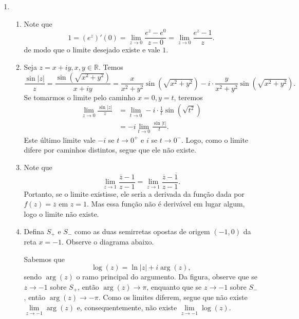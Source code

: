 \documentclass[12pt,a4paper]{article}
\begin{document}
\begin{enumerate}
		\item 
		\begin{enumerate}
			\item Note que 
			$$
			1 = (e^z)'(0) = \lim\limits_{z\to 0} \frac{e^z - e^0}{z - 0} = \lim\limits_{z\to 0} \frac{e^z - 1}{z}.
			$$ 
			de modo que o limite desejado existe e vale $1$.
			
			\item Seja $z = x+iy, x,y\in\mathbb{R}$. Temos
			$$
			\frac{\sin|z|}{z} = \frac{\sin\left(\sqrt{x^2+y^2}\right)}{x+iy} = \frac{x}{x^2+y^2}\sin\left( \sqrt{x^2+y^2} \right) - i\cdot\frac{y}{x^2+y^2}\sin\left( \sqrt{x^2+y^2} \right).
			$$
			Se tomarmos o limite pelo caminho $x = 0, y = t$, teremos
			\begin{align*}
			\lim\limits_{z\to 0}\frac{\sin|z|}{z} &= \lim\limits_{t\to 0} -i\cdot\frac{1}{t}\sin\left( \sqrt{t^2} \right) \\ 
			&= -i\lim\limits_{t\to 0}\frac{\sin|t|}{t}.
			\end{align*}
			Este último limite vale $-i$ se $t\to 0^+$ e $i$ se $t\to 0^-$. Logo, como o limite difere por caminhos distintos, segue que ele não existe.
			
			\item Note que
			$$
			\lim\limits_{z\to 1} \frac{\overline{z} - 1}{z - 1} = \lim\limits_{z\to 1} \frac{\overline{z} - \overline{1}}{z - 1}.
			$$
			Portanto, se o limite existisse, ele seria a derivada da função dada por $f(z) = \overline{z}$ em $z=1$. Mas essa função não é derivável em lugar algum, logo o limite não existe.
			
			\item Defina $S_+$ e $S_-$ como as duas semirretas opostas de origem $(-1,0)$ da reta $x=-1$. Observe o diagrama abaixo.
			
			\begin{figure}[h!]
				\centering 
			\end{figure}
		Sabemos que 
		$$
		\log(z) = \ln|z| + i\arg(z),
		$$
		sendo $\arg(z)$ o ramo principal do argumento. Da figura, observe que se $z\to -1$ sobre $S_+$, então $\arg(z)\to \pi$, enquanto que se $z\to -1$ sobre $S_-$, então $\arg(z)\to -\pi$. Como os limites diferem, segue que não existe $\displaystyle{\lim\limits_{z\to -1}}\arg(z)$ e, consequentemente, não existe $\displaystyle{\lim\limits_{z\to -1}}\log(z)$.
			

\end{enumerate}
\end{enumerate}
\end{document}
